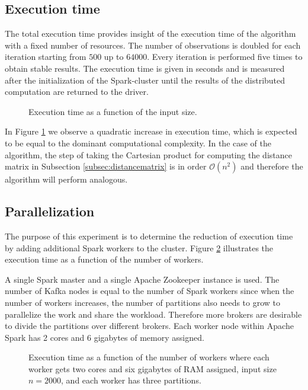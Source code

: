 \subsection{Execution time \label{subsec:executionTime}}

The total execution time provides insight of the execution time of the algorithm with a fixed number of resources. The number of observations is doubled for each iteration starting from $500$ up to $64 000$. Every iteration is performed five times to obtain stable results. The execution time is given in seconds and is measured after the initialization of the Spark-cluster until the results of the distributed computation are returned to the driver.

\begin{figure}[ht!]
    \begin{center}
        
    \caption{Execution time as a function of the input size.}
    \label{fig:executiontime}
    \end{center}
\end{figure}

In Figure \ref{fig:executiontime} we observe a quadratic increase in execution time, which is expected to be equal to the dominant computational complexity. In the case of the algorithm, the step of taking the Cartesian product for computing the distance matrix in Subsection \ref{subsec:distancematrix} is in order $\mathcal{O}(n^{2})$ and therefore the algorithm will perform analogous.

\subsection{Parallelization \label{subsec:parallelization}}

The purpose of this experiment is to determine the reduction of execution time by adding additional Spark workers to the cluster. Figure \ref{fig:parallelization} illustrates the execution time as a function of the number of workers.

A single Spark master and a single Apache Zookeeper instance is used. The number of Kafka nodes is equal to the number of Spark workers since when the number of workers increases, the number of partitions also needs to grow to parallelize the work and share the workload. Therefore more brokers are desirable to divide the partitions over different brokers. Each worker node within Apache Spark has 2 cores and 6 gigabytes of memory assigned.

\begin{figure}[ht!]
    \begin{center}
        
        \caption[Execution time as a function of workers.]{Execution time as a function of the number of workers where each worker gets two cores and six gigabytes of RAM assigned, input size $n=2000$, and each worker has three partitions.}
        \label{fig:parallelization}
    \end{center}
\end{figure}

